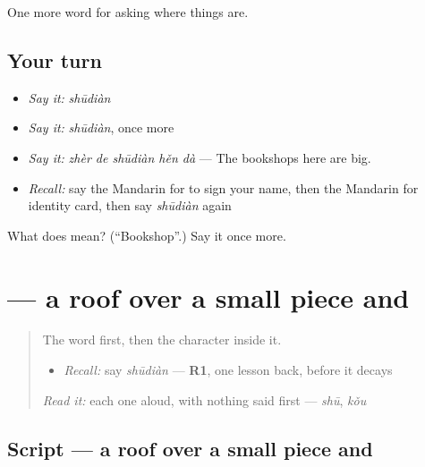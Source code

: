\begin{grammarlens}[title={What you've built}]
One more word for asking where things are.
\end{grammarlens}

\subsection*{Your turn}
\begin{itemize}
\raggedright
  \item \emph{Say it:} \emph{shūdiàn}
  \item \emph{Say it:} \emph{shūdiàn}, once more
  \item \emph{Say it:} \emph{zhèr de shūdiàn hěn dà} — The bookshops here are big.
  \item \emph{Recall:} say the Mandarin for to sign your name, then the Mandarin for identity card, then say \emph{shūdiàn} again
\end{itemize}

\begin{tcolorbox}[breakable,colback=teal!4,colframe=teal!35!black,title={Before you move on}]
What does  mean? (\textquotedblleft{}Bookshop\textquotedblright{}.) Say it once more.
\end{tcolorbox}
\section[\texorpdfstring{\zh{店} (diàn)}{店 (diàn)}]{ — a roof over a small piece and }

\label{lesson:ZH-W190-dian-shop}



\begin{quote}
The word first, then the character inside it.

\begin{itemize}
\raggedright
  \item \emph{Recall:} say \emph{shūdiàn} — \textbf{R1}, one lesson back, before it decays
\end{itemize}

\begin{quote}
 
\end{quote}

\emph{Read it:} each one aloud, with nothing said first — \emph{shū}, \emph{kǒu}
\end{quote}

\subsection*{Script — a roof over a small piece and }

